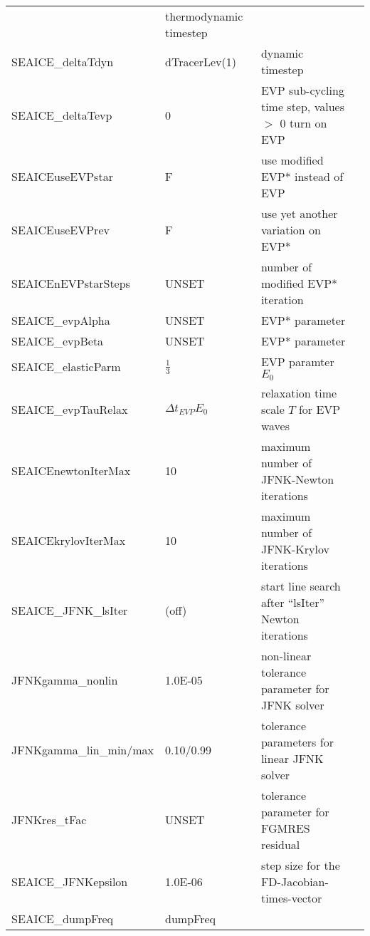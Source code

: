 \begin{table}[!ht]
{\begin{tabular}{|llp{5cm}c|}
    &   thermodynamic timestep 
    &  %
    \\
   SEAICE\_deltaTdyn    &                   dTracerLev(1)
    &   dynamic timestep 
    &  %
    \\
   SEAICE\_deltaTevp    &                   0
    &   EVP sub-cycling time step, values $>$ 0 turn on EVP
    &  
    \\
   SEAICEuseEVPstar    & F & use modified EVP* instead of EVP & %
    \\
   SEAICEuseEVPrev     & F & use yet another variation on EVP* & %
    \\
   SEAICEnEVPstarSteps & UNSET & number of modified EVP* iteration & %
    \\
   SEAICE\_evpAlpha & UNSET & EVP* parameter & %
    \\
   SEAICE\_evpBeta & UNSET & EVP* parameter & %
    \\
   SEAICE\_elasticParm & $\frac{1}{3}$ 
     & EVP paramter $E_0$ & \\
   SEAICE\_evpTauRelax & $\Delta{t}_{EVP}E_0$ 
     & relaxation time scale $T$ for EVP waves & \\
    SEAICEnewtonIterMax & 10
    & maximum number of JFNK-Newton iterations
    &  %
    \\
    SEAICEkrylovIterMax & 10
    & maximum number of JFNK-Krylov iterations
    &  %
    \\
    SEAICE\_JFNK\_lsIter & (off)
    & start line search after ``lsIter'' Newton iterations
    &  %
    \\
    JFNKgamma\_nonlin        & 1.0E-05
    & non-linear tolerance parameter for JFNK solver
    &  %
    \\
    JFNKgamma\_lin\_min/max  & 0.10/0.99
    & tolerance parameters for linear JFNK solver
    &  %
    \\
    JFNKres\_tFac            & UNSET
    & tolerance parameter for FGMRES residual
    &  %
    \\
    SEAICE\_JFNKepsilon      & 1.0E-06
    & step size for the FD-Jacobian-times-vector 
    &  %
    \\
    SEAICE\_dumpFreq     &                   dumpFreq

\end{tabular}}
\end{table}
